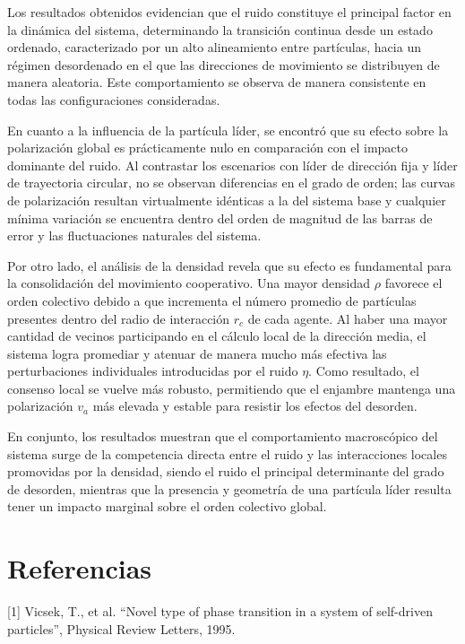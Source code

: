 \documentclass[a4paper,12pt]{article}
\begin{document}
Los resultados obtenidos evidencian que el ruido constituye el principal factor en la dinámica del sistema, determinando la transición continua desde un estado ordenado, caracterizado por un alto alineamiento entre partículas, hacia un régimen desordenado en el que las direcciones de movimiento se distribuyen de manera aleatoria. Este comportamiento se observa de manera consistente en todas las configuraciones consideradas.

En cuanto a la influencia de la partícula líder, se encontró que su efecto sobre la polarización global es prácticamente nulo en comparación con el impacto dominante del ruido. Al contrastar los escenarios con líder de dirección fija y líder de trayectoria circular, no se observan diferencias en el grado de orden; las curvas de polarización resultan virtualmente idénticas a la del sistema base y cualquier mínima variación se encuentra dentro del orden de magnitud de las barras de error y las fluctuaciones naturales del sistema.

Por otro lado, el análisis de la densidad revela que su efecto es fundamental para la consolidación del movimiento cooperativo. Una mayor densidad $\rho$ favorece el orden colectivo debido a que incrementa el número promedio de partículas presentes dentro del radio de interacción $r_c$ de cada agente. Al haber una mayor cantidad de vecinos participando en el cálculo local de la dirección media, el sistema logra promediar y atenuar de manera mucho más efectiva las perturbaciones individuales introducidas por el ruido $\eta$. Como resultado, el consenso local se vuelve más robusto, permitiendo que el enjambre mantenga una polarización $v_a$ más elevada y estable para resistir los efectos del desorden.

En conjunto, los resultados muestran que el comportamiento macroscópico del sistema surge de la competencia directa entre el ruido y las interacciones locales promovidas por la densidad, siendo el ruido el principal determinante del grado de desorden, mientras que la presencia y geometría de una partícula líder resulta tener un impacto marginal sobre el orden colectivo global.
\section*{Referencias}

 [1] Vicsek, T., et al. ``Novel type of phase transition in a system of self-driven particles'', Physical Review Letters, 1995.
\end{document}
